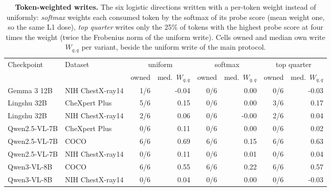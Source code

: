 \begin{table}[h]
\centering
\scriptsize
\setlength{\tabcolsep}{4pt}
\caption{\textbf{Token-weighted writes.} The six logistic directions written with a per-token weight instead of uniformly: \emph{softmax} weights each consumed token by the softmax of its probe score (mean weight one, so the same L1 dose), \emph{top quarter} writes only the 25\% of tokens with the highest probe score at four times the weight (twice the Frobenius norm of the uniform write). Cells owned and median own write $W_{q,q}$ per variant, beside the uniform write of the main protocol.}
\label{tab:cf-tokenw}
\begin{tabular}{llrrrrrr}
\toprule
Checkpoint & Dataset & \multicolumn{2}{c}{uniform} & \multicolumn{2}{c}{softmax} & \multicolumn{2}{c}{top quarter} \\
 & & owned & med.\ $W_{q,q}$ & owned & med.\ $W_{q,q}$ & owned & med.\ $W_{q,q}$ \\
\midrule
Gemma 3 12B & NIH ChestX-ray14 & 1/6 & -0.04 & 0/6 & 0.00 & 0/6 & -0.03 \\
Lingshu 32B & CheXpert Plus & 5/6 & 0.15 & 0/6 & 0.00 & 3/6 & 0.17 \\
Lingshu 32B & NIH ChestX-ray14 & 2/6 & 0.06 & 0/6 & -0.00 & 2/6 & 0.04 \\
Qwen2.5-VL-7B & CheXpert Plus & 0/6 & 0.11 & 0/6 & 0.00 & 0/6 & 0.02 \\
Qwen2.5-VL-7B & COCO & 6/6 & 0.69 & 6/6 & 0.15 & 6/6 & 0.63 \\
Qwen2.5-VL-7B & NIH ChestX-ray14 & 0/6 & 0.11 & 0/6 & 0.01 & 0/6 & 0.04 \\
Qwen3-VL-8B & COCO & 6/6 & 0.55 & 6/6 & 0.22 & 6/6 & 0.57 \\
Qwen3-VL-8B & NIH ChestX-ray14 & 0/6 & 0.04 & 0/6 & 0.00 & 0/6 & -0.03 \\
\bottomrule
\end{tabular}
\end{table}
